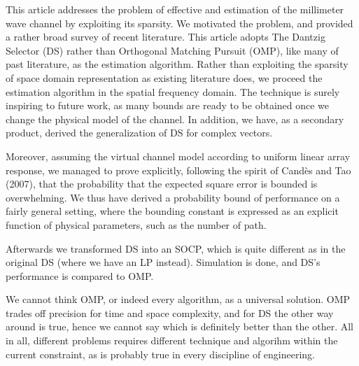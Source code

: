 
\startchapter [title={Conclusion}]

This article addresses the problem of effective and estimation of the millimeter wave channel by exploiting its sparsity.
We motivated the problem, and provided a rather broad survey of recent literature.
This article adopts The Dantzig Selector (DS) rather than Orthogonal Matching Pursuit (OMP), like many of past literature, as the estimation algorithm.
Rather than exploiting the sparsity of space domain representation as existing literature does, we proceed the estimation algorithm in the spatial frequency domain.
The technique is surely inspiring to future work, as many bounds are ready to be obtained once we change the physical model of the channel.
In addition, we have, as a secondary product, derived the generalization of DS for complex vectors.

Moreover, assuming the virtual channel model according to uniform linear array response, we managed to prove explicitly, following the spirit of Cand\`es and Tao (2007), that the probability that the expected square error is bounded is overwhelming.
We thus have derived a probability bound of performance on a fairly general setting, where the bounding constant is expressed as an explicit function of physical parameters, such as the number of path.

Afterwards we transformed DS into an SOCP, which is quite different as in the original DS (where we have an LP instead).
Simulation is done, and DS's performance is compared to OMP.
\color[red]{(To be done)}

We cannot think OMP, or indeed every algorithm, as a universal solution.
OMP trades off precision for time and space complexity, and for DS the other way around is true, hence we cannot say which is definitely better than the other.
All in all, different problems requires different technique and algorihm within the current constraint, as is probably true in every discipline of engineering.

\stopchapter


